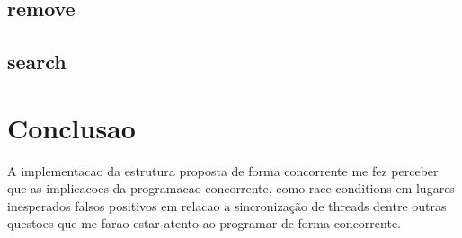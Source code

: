 \documentclass[
	article,			%
	11pt,				%
	oneside,			%
	a4paper,			%
	english,			%
	brazil,				%
	sumario=tradicional
	]{abntex2}
\begin{document}
\subsection{remove}

\subsection{search}



\section*{Conclusao}
A implementacao da estrutura proposta de forma concorrente me fez
perceber que as implicacoes da programacao concorrente, como race
conditions em lugares inesperados falsos positivos em relacao a
sincronização de threads dentre outras questoes que me farao estar
atento ao programar de forma concorrente.

\end{document}
